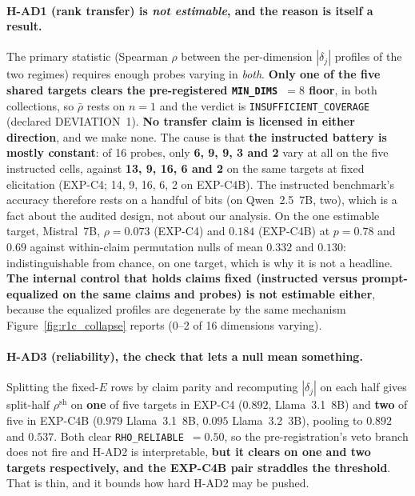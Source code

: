\paragraph{H-AD1 (rank transfer) is \emph{not estimable}, and the reason is itself a result.} The primary statistic (Spearman $\rho$ between the per-dimension $|\delta_j|$ profiles of the two regimes) requires enough probes varying in \emph{both}. \textbf{Only one of the five shared targets clears the pre-registered \texttt{MIN\_DIMS}~$=8$ floor}, in both collections, so $\bar\rho$ rests on $n\!=\!1$ and the verdict is \texttt{INSUFFICIENT\_COVERAGE} (declared DEVIATION~1). \textbf{No transfer claim is licensed in either direction}, and we make none. The cause is that \textbf{the instructed battery is mostly constant}: of 16 probes, only \textbf{6, 9, 9, 3 and 2} vary at all on the five instructed cells, against \textbf{13, 9, 16, 6 and 2} on the same targets at fixed elicitation (EXP-C4; 14, 9, 16, 6, 2 on EXP-C4B). The instructed benchmark's accuracy therefore rests on a handful of bits (on Qwen~2.5~7B, two), which is a fact about the audited design, not about our analysis. On the one estimable target, Mistral~7B, $\rho\!=\!0.073$ (EXP-C4) and $0.184$ (EXP-C4B) at $p\!=\!0.78$ and $0.69$ against within-claim permutation nulls of mean $0.332$ and $0.130$: indistinguishable from chance, on one target, which is why it is not a headline. \textbf{The internal control that holds claims fixed (instructed versus prompt-equalized on the same claims and probes) is not estimable either}, because the equalized profiles are degenerate by the same mechanism Figure~\ref{fig:r1c_collapse} reports (0--2 of 16 dimensions varying).

\paragraph{H-AD3 (reliability), the check that lets a null mean something.} Splitting the fixed-$E$ rows by claim parity and recomputing $|\delta_j|$ on each half gives split-half $\rho^{\mathrm{sh}}$ on \textbf{one} of five targets in EXP-C4 ($0.892$, Llama~3.1~8B) and \textbf{two} of five in EXP-C4B ($0.979$ Llama~3.1~8B, $0.095$ Llama~3.2~3B), pooling to $0.892$ and $0.537$. Both clear \texttt{RHO\_RELIABLE}~$=0.50$, so the pre-registration's veto branch does not fire and H-AD2 is interpretable, \textbf{but it clears on one and two targets respectively, and the EXP-C4B pair straddles the threshold}. That is thin, and it bounds how hard H-AD2 may be pushed.

